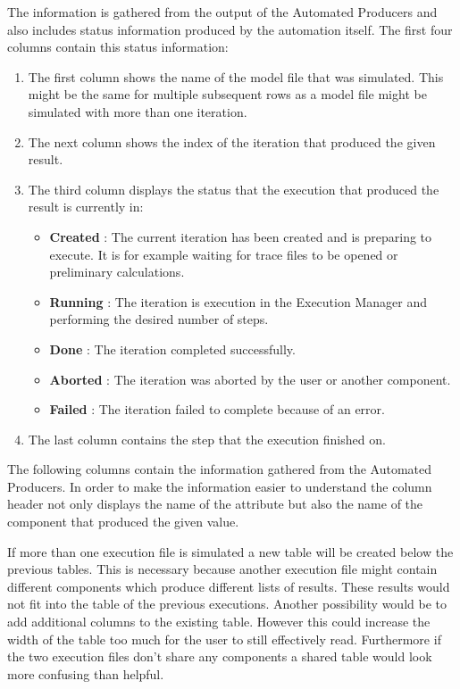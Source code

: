 The information is gathered from the output of the Automated Producers and also
includes status information produced by the automation itself. The first four
columns contain this status information:
\begin{enumerate}
 \item The first column shows the name of the model file that was simulated. This
might be the same for multiple subsequent rows as a model file might be simulated
with more than one iteration.
 \item The next column shows the index of the iteration that produced the given result.
 \item The third column displays the status that the execution that produced the result
is currently in:
\begin{itemize}
 \item \textbf{Created} : The current iteration has been created and is preparing to execute.
It is for example waiting for trace files to be opened or preliminary calculations.
 \item \textbf{Running} : The iteration is execution in the Execution Manager and performing
the desired number of steps.
 \item \textbf{Done} : The iteration completed successfully.
 \item \textbf{Aborted} : The iteration was aborted by the user or another component.
 \item \textbf{Failed} : The iteration failed to complete because of an error.
\end{itemize}
 \item The last column contains the step that the execution finished on.
\end{enumerate}
The following columns contain the information gathered from the Automated Producers.
In order to make the information easier to understand the column header not only displays
the name of the attribute but also the name of the component that produced the given
value.

If more than one execution file is simulated a new table will be created below the previous
tables. This is necessary because another execution file might contain different
components which produce different lists of results. These results would not fit into
the table of the previous executions. Another possibility would be to add additional columns
to the existing table. However this could increase the width of the table too much for the
user to still effectively read. Furthermore if the two execution files don't share any
components a shared table would look more confusing than helpful.

